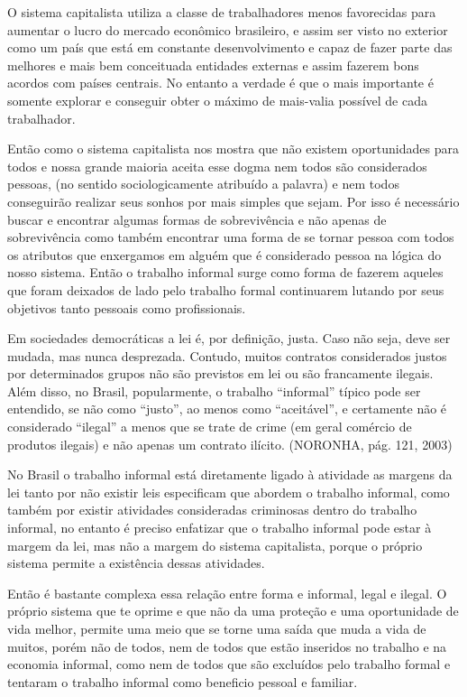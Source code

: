 O sistema capitalista utiliza a classe de trabalhadores menos favorecidas para aumentar o lucro do mercado econômico brasileiro, e assim ser visto no exterior como um país que está em constante desenvolvimento e capaz de fazer parte das melhores e mais bem conceituada entidades externas e assim fazerem bons acordos com países centrais. No entanto a verdade é que o mais importante é somente explorar e conseguir obter o máximo de mais-valia possível de cada trabalhador.

Então como o sistema capitalista nos mostra que não existem oportunidades para todos e nossa grande maioria aceita esse dogma nem todos são considerados pessoas, (no sentido sociologicamente atribuído a palavra) e nem todos conseguirão realizar seus sonhos por mais simples que sejam. Por isso é necessário buscar e encontrar algumas formas de sobrevivência e não apenas de sobrevivência como também encontrar uma forma de se tornar pessoa com todos os atributos que enxergamos em alguém que é considerado pessoa na lógica do nosso sistema. Então o trabalho informal surge como forma de fazerem aqueles que foram deixados de lado pelo trabalho formal continuarem lutando por seus objetivos tanto pessoais como profissionais.

\begin{citacao}
Em sociedades democráticas a lei é, por definição, justa. Caso não seja, deve ser mudada, mas nunca desprezada. Contudo, muitos contratos considerados justos por determinados grupos não são previstos em lei ou são francamente ilegais. Além disso, no Brasil, popularmente, o trabalho ``informal'' típico pode ser entendido, se não como ``justo'', ao menos como ``aceitável'', e certamente não é considerado ``ilegal'' a menos que se trate de crime (em geral comércio de produtos ilegais) e não apenas um contrato ilícito. (NORONHA, pág. 121, 2003)
\end{citacao}

No Brasil o trabalho informal está diretamente ligado à atividade as margens da lei tanto por não existir leis especificam que abordem o trabalho informal, como também por existir atividades consideradas criminosas dentro do trabalho informal, no entanto é preciso enfatizar que o trabalho informal pode estar à margem da lei, mas não a margem do sistema capitalista, porque o próprio sistema permite a existência dessas atividades.

Então é bastante complexa essa relação entre forma e informal, legal e ilegal. O próprio sistema que te oprime e que não da uma proteção e uma oportunidade de vida melhor, permite uma meio que se torne uma saída que muda a vida de muitos, porém não de todos, nem de todos que estão inseridos no trabalho e na economia informal, como nem de todos que são excluídos pelo trabalho formal e tentaram o trabalho informal como beneficio pessoal e familiar.

